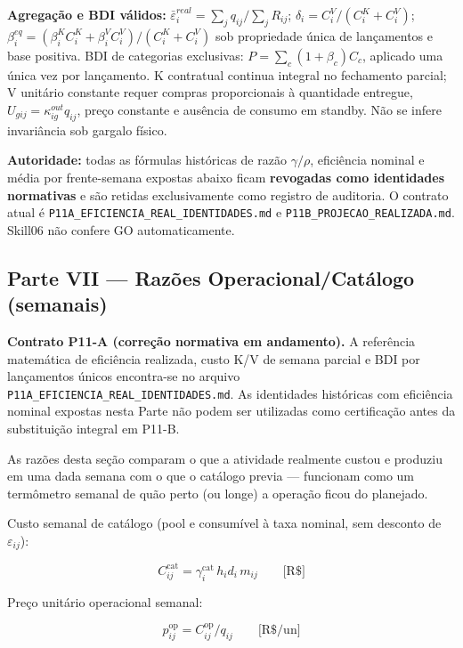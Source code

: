 \documentclass[
  10pt,
]{article}
\begin{document}
\noindent\textbf{Agregação e BDI válidos:}
\(\bar\varepsilon_i^{real}=\sum_jq_{ij}/\sum_jR_{ij}\);
\(\delta_i=C_i^V/(C_i^K+C_i^V)\);
\(\beta_i^{eq}=(\beta_i^KC_i^K+\beta_i^VC_i^V)/(C_i^K+C_i^V)\)
sob propriedade única de lançamentos e base positiva.
BDI de categorias exclusivas:
\(P=\sum_c(1+\beta_c)C_c\), aplicado uma única vez por lançamento.
K contratual continua integral no fechamento parcial; V unitário
constante requer compras proporcionais à quantidade entregue,
\(U_{gij}=\kappa_{ig}^{out}q_{ij}\), preço constante e ausência de
consumo em standby. Não se infere invariância sob gargalo físico.

\noindent\textbf{Autoridade:} todas as fórmulas históricas de razão
\(\gamma/\rho\), eficiência nominal e média por frente-semana expostas
abaixo ficam \textbf{revogadas como identidades normativas} e são
retidas exclusivamente como registro de auditoria. O contrato atual é
\texttt{P11A\_EFICIENCIA\_REAL\_IDENTIDADES.md} e
\texttt{P11B\_PROJECAO\_REALIZADA.md}. Skill06 não confere GO automaticamente.

\hypertarget{parte-vii-razuxf5es-operacionalcatuxe1logo-semanais}{%
\subsection{Parte VII --- Razões Operacional/Catálogo
(semanais)}\label{parte-vii-razuxf5es-operacionalcatuxe1logo-semanais}}

\noindent\textbf{Contrato P11-A (correção normativa em andamento).}
A referência matemática de eficiência realizada, custo K/V de semana
parcial e BDI por lançamentos únicos encontra-se no arquivo
\texttt{P11A\_EFICIENCIA\_REAL\_IDENTIDADES.md}. As identidades
históricas com eficiência nominal expostas nesta Parte não podem ser
utilizadas como certificação antes da substituição integral em P11-B.

As razões desta seção comparam o que a atividade realmente custou e
produziu em uma dada semana com o que o catálogo previa --- funcionam
como um termômetro semanal de quão perto (ou longe) a operação ficou do
planejado.

Custo semanal de catálogo (pool e consumível à taxa nominal, sem
desconto de \(\varepsilon_{ij}\)):

\[C_{ij}^{\mathrm{cat}} = \gamma_i^{\mathrm{cat}}\,h_id_i\,m_{ij}\qquad\text{[R\$]}\]

Preço unitário operacional semanal:

\[p_{ij}^{\mathrm{op}} = C_{ij}^{\mathrm{op}}/q_{ij}\qquad\text{[R\$/un]}\]
\end{document}
